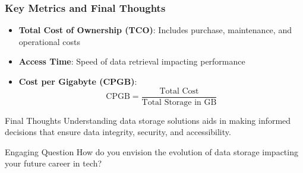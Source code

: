 \documentclass[aspectratio=169]{beamer}
\begin{document}
\begin{frame}[fragile]
    \frametitle{Key Metrics and Final Thoughts}
    \begin{itemize}
        \item \textbf{Total Cost of Ownership (TCO)}: Includes purchase, maintenance, and operational costs
        \item \textbf{Access Time}: Speed of data retrieval impacting performance
        \item \textbf{Cost per Gigabyte (CPGB)}:
            \begin{equation}
            \text{CPGB} = \frac{\text{Total Cost}}{\text{Total Storage in GB}}
            \end{equation}
    \end{itemize}

    \begin{block}{Final Thoughts}
        Understanding data storage solutions aids in making informed decisions that ensure data integrity, security, and accessibility. 
    \end{block}
    
    \begin{block}{Engaging Question}
        How do you envision the evolution of data storage impacting your future career in tech? 
    \end{block}
\end{frame}
\end{document}
